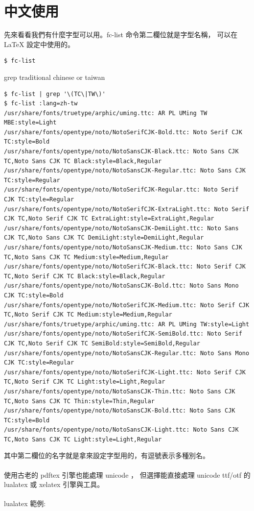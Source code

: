 \section{中文使用}
先來看看我們有什麼字型可以用。fc-list 命令第二欄位就是字型名稱，
可以在 \LaTeX{} 設定中使用的。
\begin{verbatim}
$ fc-list 
\end{verbatim}
grep traditional chinese or taiwan
\begin{scriptsize}
\begin{verbatim}
$ fc-list | grep '\(TC\|TW\)'
$ fc-list :lang=zh-tw
/usr/share/fonts/truetype/arphic/uming.ttc: AR PL UMing TW MBE:style=Light
/usr/share/fonts/opentype/noto/NotoSerifCJK-Bold.ttc: Noto Serif CJK TC:style=Bold
/usr/share/fonts/opentype/noto/NotoSansCJK-Black.ttc: Noto Sans CJK TC,Noto Sans CJK TC Black:style=Black,Regular
/usr/share/fonts/opentype/noto/NotoSansCJK-Regular.ttc: Noto Sans CJK TC:style=Regular
/usr/share/fonts/opentype/noto/NotoSerifCJK-Regular.ttc: Noto Serif CJK TC:style=Regular
/usr/share/fonts/opentype/noto/NotoSerifCJK-ExtraLight.ttc: Noto Serif CJK TC,Noto Serif CJK TC ExtraLight:style=ExtraLight,Regular
/usr/share/fonts/opentype/noto/NotoSansCJK-DemiLight.ttc: Noto Sans CJK TC,Noto Sans CJK TC DemiLight:style=DemiLight,Regular
/usr/share/fonts/opentype/noto/NotoSansCJK-Medium.ttc: Noto Sans CJK TC,Noto Sans CJK TC Medium:style=Medium,Regular
/usr/share/fonts/opentype/noto/NotoSerifCJK-Black.ttc: Noto Serif CJK TC,Noto Serif CJK TC Black:style=Black,Regular
/usr/share/fonts/opentype/noto/NotoSansCJK-Bold.ttc: Noto Sans Mono CJK TC:style=Bold
/usr/share/fonts/opentype/noto/NotoSerifCJK-Medium.ttc: Noto Serif CJK TC,Noto Serif CJK TC Medium:style=Medium,Regular
/usr/share/fonts/truetype/arphic/uming.ttc: AR PL UMing TW:style=Light
/usr/share/fonts/opentype/noto/NotoSerifCJK-SemiBold.ttc: Noto Serif CJK TC,Noto Serif CJK TC SemiBold:style=SemiBold,Regular
/usr/share/fonts/opentype/noto/NotoSansCJK-Regular.ttc: Noto Sans Mono CJK TC:style=Regular
/usr/share/fonts/opentype/noto/NotoSerifCJK-Light.ttc: Noto Serif CJK TC,Noto Serif CJK TC Light:style=Light,Regular
/usr/share/fonts/opentype/noto/NotoSansCJK-Thin.ttc: Noto Sans CJK TC,Noto Sans CJK TC Thin:style=Thin,Regular
/usr/share/fonts/opentype/noto/NotoSansCJK-Bold.ttc: Noto Sans CJK TC:style=Bold
/usr/share/fonts/opentype/noto/NotoSansCJK-Light.ttc: Noto Sans CJK TC,Noto Sans CJK TC Light:style=Light,Regular
\end{verbatim}
\end{scriptsize}
其中第二欄位的名字就是拿來設定字型用的，有逗號表示多種別名。
\\\\
使用古老的 pdftex 引擎也能處理 unicode ，
但選擇能直接處理 unicode ttf/otf 的 lualatex 或 xelatex 引擎與工具。
\\\\
lualatex 範例:

